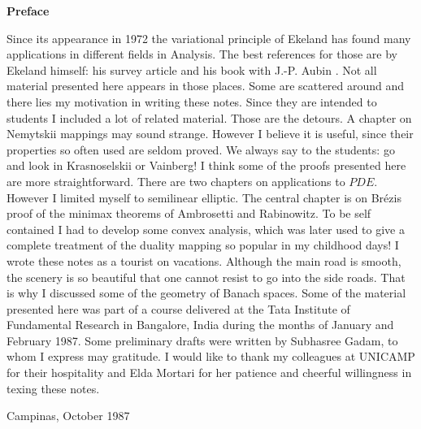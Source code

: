 \thispagestyle{empty}
\begin{center}
{\Large\bf Preface}
\end{center}
\medskip

Since its appearance in 1972 the variational principle of Ekeland has
found many applications in different fields in Analysis. The best
references for those are by Ekeland himself: his survey article
\cite{key23} and his book with J.-P. Aubin \cite{key2}. Not all
material presented here appears in those places. Some are scattered
around and there lies my motivation in writing these notes. Since they
are intended to students I included a lot of related material. Those
are the detours. A chapter on Nemytskii mappings may sound
strange. However I believe it is useful, since their properties so
often used are seldom proved. We always say to the students: go and
look in Krasnoselskii or Vainberg! I think some of the proofs
presented here are more straightforward. There are two chapters on
applications to $PDE$. However I limited myself to semilinear
elliptic. The central chapter is on Br\'ezis proof of the minimax
theorems of Ambrosetti and Rabinowitz. To be self contained I had to
develop some convex analysis, which was later used to give a complete
treatment of the duality mapping so popular in my childhood days! I
wrote these notes as a tourist on vacations. Although the main road is
smooth, the scenery is so beautiful that one cannot resist to go into
the side roads. That is why I discussed some of the geometry of Banach
spaces. Some of the material presented here was part of a course
delivered at the Tata Institute of Fundamental Research in Bangalore,
India during the months of January and February 1987. Some preliminary
drafts were written by Subhasree Gadam, to whom I express may
gratitude. I would like to thank my colleagues at UNICAMP for their
hospitality and Elda Mortari for her patience and cheerful willingness
in texing these notes.

\bigskip

\hfill Campinas, October 1987

